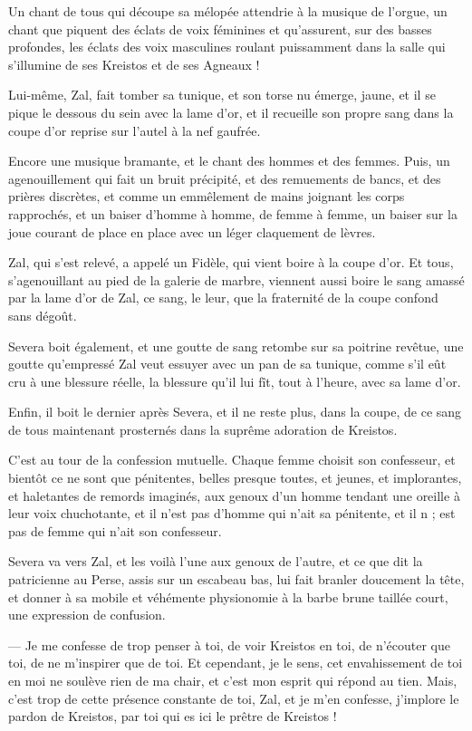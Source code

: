 \documentclass[a4paper, 11pt, oneside, polutonikogreek, french]{article}
\begin{document}
Un chant de tous qui découpe sa mélopée attendrie à la musique de l'orgue, un chant que piquent des éclats de voix féminines et qu'assurent, sur des basses profondes, les éclats des voix masculines roulant puissamment dans la salle qui s'illumine de ses Kreistos et de ses Agneaux !

Lui-même, Zal, fait tomber sa tunique, et son torse nu émerge, jaune, et il se pique le dessous du sein avec la lame d'or, et il recueille son propre sang dans la coupe d'or reprise sur l'autel à la nef gaufrée.

Encore une musique bramante, et le chant des hommes et des femmes. Puis, un agenouillement qui fait un bruit précipité, et des remuements de bancs, et des prières discrètes, et comme un emmêlement de mains joignant les corps rapprochés, et un baiser d'homme à homme, de femme à femme, un baiser sur la joue courant de place en place avec un léger claquement de lèvres.

Zal, qui s'est relevé, a appelé un Fidèle, qui vient boire à la coupe d'or. Et tous, s'agenouillant au pied de la galerie de marbre, viennent aussi boire le sang amassé par la lame d'or de Zal, ce sang, le leur, que la fraternité de la coupe confond sans dégoût.

Severa boit également, et une goutte de sang retombe sur sa poitrine revêtue, une goutte qu'empressé Zal veut essuyer avec un pan de sa tunique, comme s'il eût cru à une blessure réelle, la blessure qu'il lui fît, tout à l'heure, avec sa lame d'or.

Enfin, il boit le dernier après Severa, et il ne reste plus, dans la coupe, de ce sang de tous maintenant prosternés dans la suprême adoration de Kreistos.

C'est au tour de la confession mutuelle. Chaque femme choisit son confesseur, et bientôt ce ne sont que pénitentes, belles presque toutes, et jeunes, et implorantes, et haletantes de remords imaginés, aux genoux d'un homme tendant une oreille à leur voix chuchotante, et il n'est pas d'homme qui n'ait sa pénitente, et il n ; est pas de femme qui n'ait son confesseur.

Severa va vers Zal, et les voilà l'une aux genoux de l'autre, et ce que dit la patricienne au Perse, assis sur un escabeau bas, lui fait branler doucement la tête, et donner à sa mobile et véhémente physionomie à la barbe brune taillée court, une expression de confusion.

--- Je me confesse de trop penser à toi, de voir Kreistos en toi, de n'écouter que toi, de ne m'inspirer que de toi. Et cependant, je le sens, cet envahissement de toi en moi ne soulève rien de ma chair, et c'est mon esprit qui répond au tien. Mais, c'est trop de cette présence constante de toi, Zal, et je m'en confesse, j'implore le pardon de Kreistos, par toi qui es ici le prêtre de Kreistos !
\end{document}
